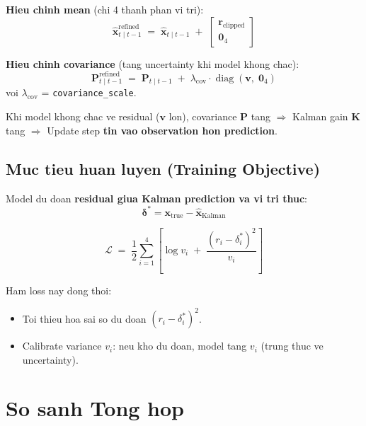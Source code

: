 \documentclass[12pt, a4paper]{article}
\newcommand{\mat}[1]{\mathbf{#1}}
\newcommand{\vect}[1]{\bm{#1}}
\newcommand{\diag}{\operatorname{diag}}
\begin{document}
\begin{formulabox}
\textbf{Hieu chinh mean} (chi 4 thanh phan vi tri):
\[
  \hat{\vect{x}}_{t \mid t-1}^{\text{refined}} \;=\;
  \hat{\vect{x}}_{t \mid t-1} \;+\;
  \begin{bmatrix} \vect{r}_{\text{clipped}} \\ \vect{0}_4 \end{bmatrix}
\]

\textbf{Hieu chinh covariance} (tang uncertainty khi model khong chac):
\[
  \mat{P}_{t \mid t-1}^{\text{refined}} \;=\;
  \mat{P}_{t \mid t-1} \;+\;
  \lambda_{\text{cov}} \cdot \diag(\vect{v},\; \vect{0}_4)
\]
voi $\lambda_{\text{cov}}$ = \texttt{covariance\_scale}.
\end{formulabox}

\begin{notebox}
Khi model khong chac ve residual ($\vect{v}$ lon),
covariance $\mat{P}$ tang $\Rightarrow$ Kalman gain $\mat{K}$ tang $\Rightarrow$
Update step \textbf{tin vao observation hon prediction}.
\end{notebox}

\subsection{Muc tieu huan luyen (Training Objective)}

Model du doan \textbf{residual giua Kalman prediction va vi tri thuc}:
\[
  \vect{\delta}^* = \vect{x}_{\text{true}} - \hat{\vect{x}}_{\text{Kalman}}
\]

\begin{formulabox}
\[
  \mathcal{L} \;=\; \frac{1}{2} \sum_{i=1}^{4} \left[
    \log v_i \;+\; \frac{(r_i - \delta^*_i)^2}{v_i}
  \right]
\]
\end{formulabox}

Ham loss nay dong thoi:
\begin{itemize}
  \item Toi thieu hoa sai so du doan $(r_i - \delta^*_i)^2$.
  \item Calibrate variance $v_i$: neu kho du doan, model tang $v_i$ (trung thuc ve uncertainty).
\end{itemize}

\newpage
\section{So sanh Tong hop}
\end{document}
